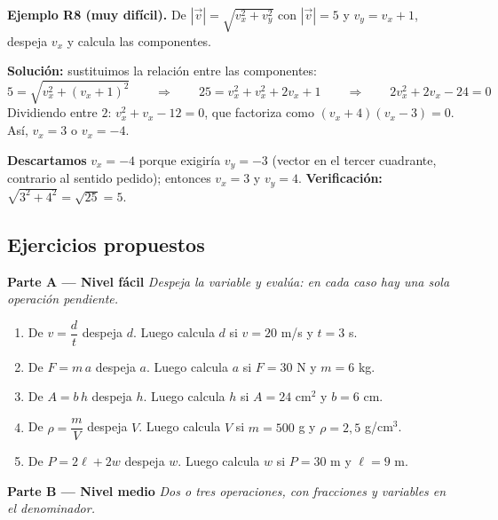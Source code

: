 \documentclass[12pt, letterpaper]{article}
\begin{document}
\textbf{Ejemplo R8 (muy difícil).} De $|\vec{v}| = \sqrt{v_x^2 + v_y^2}$ con $|\vec{v}| = 5$ y $v_y = v_x + 1$, despeja $v_x$ y calcula las componentes.

\begin{cuadrosolucion}
  \textbf{Solución:} sustituimos la relación entre las componentes:
  $$5 = \sqrt{v_x^2 + (v_x + 1)^2} \qquad \Longrightarrow \qquad 25 = v_x^2 + v_x^2 + 2v_x + 1 \qquad \Longrightarrow \qquad 2v_x^2 + 2v_x - 24 = 0$$
  Dividiendo entre $2$: $v_x^2 + v_x - 12 = 0$, que factoriza como $(v_x + 4)(v_x - 3) = 0$. Así, $v_x = 3$ o $v_x = -4$.

  \textbf{Descartamos} $v_x = -4$ porque exigiría $v_y = -3$ (vector en el tercer cuadrante, contrario al sentido pedido); entonces $v_x = 3$ y $v_y = 4$. \textbf{Verificación:} $\sqrt{3^2 + 4^2} = \sqrt{25} = 5$. \checkmark
\end{cuadrosolucion}

\subsection{Ejercicios propuestos}

\noindent\textbf{Parte A --- Nivel fácil \facil}\quad \emph{Despeja la variable y evalúa: en cada caso hay una sola operación pendiente.}

\begin{enumerate}[leftmargin=*, resume]
  \item \facil{} De $v = \dfrac{d}{t}$ despeja $d$. Luego calcula $d$ si $v = 20$ m/s y $t = 3$ s.

  \item \facil{} De $F = m\,a$ despeja $a$. Luego calcula $a$ si $F = 30$ N y $m = 6$ kg.

  \item \facil{} De $A = b\,h$ despeja $h$. Luego calcula $h$ si $A = 24$ cm$^2$ y $b = 6$ cm.

  \item \facil{} De $\rho = \dfrac{m}{V}$ despeja $V$. Luego calcula $V$ si $m = 500$ g y $\rho = 2{,}5$ g/cm$^3$.

  \item \facil{} De $P = 2\ell + 2w$ despeja $w$. Luego calcula $w$ si $P = 30$ m y $\ell = 9$ m.
\end{enumerate}

\medskip
\noindent\textbf{Parte B --- Nivel medio \medio}\quad \emph{Dos o tres operaciones, con fracciones y variables en el denominador.}
\end{document}
